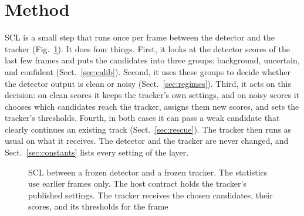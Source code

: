 \documentclass[pdflatex,sn-mathphys-num,iicol]{sn-jnl}
\newcommand{\scl}{SCL}
\begin{document}
\section{Method}\label{sec:method}

\scl{} is a small step that runs once per frame between the detector and the
tracker (Fig.~\ref{fig:arch}). It does four things. First, it looks at the
detector scores of the last few frames and puts the candidates into three
groups: background, uncertain, and confident (Sect.~\ref{sec:calib}).
Second, it uses these groups to decide whether the detector output is clean
or noisy (Sect.~\ref{sec:regimes}). Third, it acts on this decision: on
clean scores it keeps the tracker's own settings, and on noisy scores it
chooses which candidates reach the tracker, assigns them new scores, and sets
the tracker's thresholds. Fourth, in both cases it can pass a weak candidate
that clearly continues an existing track (Sect.~\ref{sec:rescue}). The
tracker then runs as usual on what it receives. The detector and the tracker
are never changed, and Sect.~\ref{sec:constants} lists every setting of the
layer.

\begin{figure}[t]
\centering
{}
\caption{\scl{} between a frozen detector
and a frozen tracker. The statistics use earlier frames only. The host
contract holds the tracker's published settings. The tracker receives the
chosen candidates, their scores, and its thresholds for the frame}
\label{fig:arch}
\end{figure}
\end{document}

